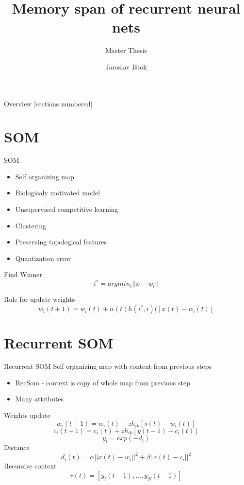 \documentclass[10pt]{beamer}
\title{Memory span of recurrent neural nets}
\subtitle{Master Thesis}
\date{}
\author{Jaroslav Ištok}
\begin{document}
\maketitle

\begin{frame}{Overview}
  [sections numbered]
  \tableofcontents[hideallsubsections]
\end{frame}

\section{SOM}


\begin{frame}[fragile]{SOM}

\begin{itemize}
\item Self organizing map
\item Biologicaly motivated model
\item Unsupervised competitive learning
\item Clustering
\item Preserving topological features
\item Quantization error
\end{itemize}

Find Winner
\begin{equation*}
i^* = argmin_i||x-w_i|| 
\end{equation*}

Rule for update weights
\begin{equation*}
w_i(t+1) = w_i(t) + \alpha(t)h(i^*, i)([x(t) - w_i(t)]
\end{equation*}

\end{frame}

\section{Recurrent SOM}

\begin{frame}[fragile]{Recurrent SOM}
Self organizing map with context from previous steps
\begin{itemize}
\item RecSom - context is copy of whole map from previous step
\item Many attributes
\end{itemize}
Weights update
\begin{equation*}
w_i(t+1) = w_i(t) + zh_{ik}[s(t) - w_i(t)]
\end{equation*}
\begin{equation*}
c_i(t+1) = c_i(t) + zh_{ik}[y(t - 1) - c_i(t)]
\end{equation*}
\begin{equation*}
y_i=exp(-d_i)
\end{equation*}
Distance
\begin{equation*}
d_i(t) = \alpha||x(t)-w_i||^2 + \beta||r(t)-c_i||^2
\end{equation*}
Recursive context
\begin{equation*}
r(t)=[y_i(t-1),...,y_N(t-1)]
\end{equation*}
\end{frame}
\end{document}

